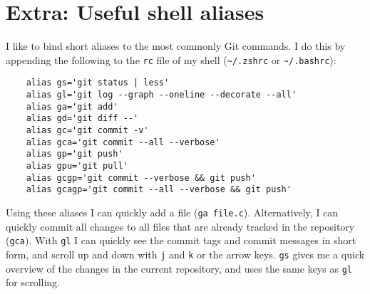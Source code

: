 \documentclass[11pt]{article}
\begin{document}
\section{Extra: Useful shell aliases}
I like to bind short aliases to the most commonly Git commands. I do this by 
appending the following to the \texttt{rc} file of my shell 
(\texttt{\textasciitilde/.zshrc} or \texttt{\textasciitilde/.bashrc}):
\begin{lstlisting}
    alias gs='git status | less'
    alias gl='git log --graph --oneline --decorate --all'
    alias ga='git add'
    alias gd='git diff --'
    alias gc='git commit -v'
    alias gca='git commit --all --verbose'
    alias gp='git push'
    alias gpu='git pull'
    alias gcgp='git commit --verbose && git push'
    alias gcagp='git commit --all --verbose && git push'
\end{lstlisting}
Using these aliases I can quickly add a file (\texttt{ga file.c}).  
Alternatively, I can quickly commit all changes to all files that are already 
tracked in the repository (\texttt{gca}).
With \texttt{gl} I can quickly see the commit tags and commit messages in short 
form, and scroll up and down with \texttt{j} and \texttt{k} or the arrow keys.  
\texttt{gs} gives me a quick overview of the changes in the current repository, 
and uses the same keys as \texttt{gl} for scrolling.
\end{document}

